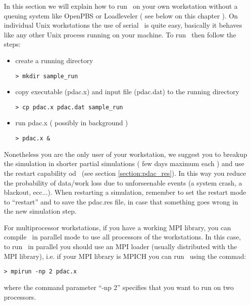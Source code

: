 In this section we will explain how to run \PDAC\ on your own
workstation without a queuing system like
OpenPBS or Loadleveler ( see below on this chapter ).
On individual Unix workstations the use of serial \PDAC\ is
quite easy, basically it behaves like any other Unix process
running on your machine.
To run \PDAC\ then follow the steps:

\begin{itemize}

\item create a running directory\
\begin{verbatim}
> mkdir sample_run
\end{verbatim}

\item copy executable (pdac.x) and input file (pdac.dat)
      to the running directory\
\begin{verbatim}
> cp pdac.x pdac.dat sample_run
\end{verbatim}

\item run pdac.x ( possibly in background )
\begin{verbatim}
> pdac.x &
\end{verbatim}

\end{itemize}

Nonetheless you are the only user of your workstation,
we suggest you to breakup the simulation in shorter partial
simulations ( few days maximum each ) and use the
restart capability od \PDAC\ (see section \ref{section:pdac_res}). 
In this way you reduce the probability of data/work loss due to 
unforseenable events (a system crash, a blackout, ecc...).
When restarting a simulation, remember to set the 
restart mode to ``restart'' and to save the pdac.res file,
in case that something goes wrong in the new simulation step.

For multiprocessor workstations, if you have a working MPI
library, you can compile \PDAC\ in parallel mode to use
all processors of the workstations. In this case,
to run \PDAC\ in parallel you should use an MPI loader 
(usually distributed with the MPI library), i.e. if
your MPI library is MPICH you can run \PDAC\ using the commad:

\begin{verbatim}
> mpirun -np 2 pdac.x
\end{verbatim}

where the command parameter ``-np 2'' specifies that you want
to run on two processors.

